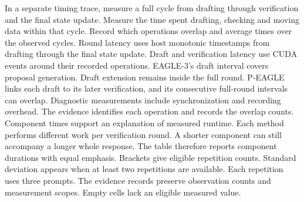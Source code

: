 \begin{table}[!htp]
\begin{minipage}{\linewidth}
In a separate timing trace, measure a full cycle from drafting through verification and the final state update. Measure the time spent drafting, checking and moving data within that cycle. Record which operations overlap and average times over the observed cycles. Round latency uses host monotonic timestamps from drafting through the final state update. Draft and verification latency use CUDA events around their recorded operations. EAGLE-3's draft interval covers proposal generation. Draft extension remains inside the full round. P-EAGLE links each draft to its later verification, and its consecutive full-round intervals can overlap. Diagnostic measurements include synchronization and recording overhead. The evidence identifies each operation and records the overlap counts.
Component times support an explanation of measured runtime. Each method performs different work per verification round. A shorter component can still accompany a longer whole response. The table therefore reports component durations with equal emphasis.
Brackets give eligible repetition counts. Standard deviation appears when at least two repetitions are available. Each repetition uses three prompts. The evidence records preserve observation counts and measurement scopes. Empty cells lack an eligible measured value.
\end{minipage}
\end{table}

